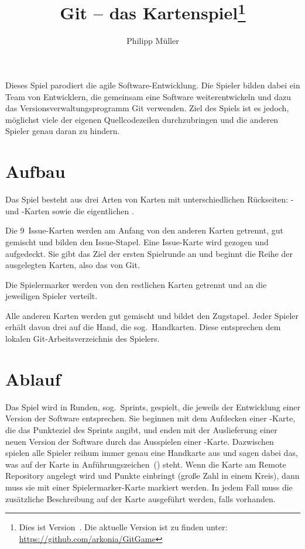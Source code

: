 \documentclass[DIV=15, fontsize=11pt]{gitgame}
\title{Git -- das Kartenspiel\footnote{Dies ist Version~\gitgameversion. Die aktuelle Version ist zu finden unter: \url{https://github.com/arkonia/GitGame}}}
\author{Philipp Müller}
\begin{document}
\maketitle

Dieses Spiel parodiert die agile Software-Entwicklung. Die Spieler bilden dabei ein Team von Entwicklern, die gemeinsam eine Software weiterentwickeln und dazu das Versionsverwaltungsprogramm Git verwenden. Ziel des Spiels ist es jedoch, möglichst viele der eigenen Quellcodezeilen durchzubringen und die anderen Spieler genau daran zu hindern.



\section{Aufbau}
Das Spiel besteht aus drei Arten von Karten mit unterschiedlichen Rückseiten: - und -Karten sowie die eigentlichen .


Die 9~Issue-Karten werden am Anfang von den anderen Karten getrennt, gut gemischt und bilden den Issue-Stapel. Eine Issue-Karte wird gezogen und aufgedeckt. Sie gibt das Ziel der ersten Spielrunde an und beginnt die Reihe der ausgelegten Karten, also das  von Git.

Die Spielermarker werden von den restlichen Karten getrennt und an die jeweiligen Spieler verteilt.

Alle anderen Karten werden gut gemischt und bildet den Zugstapel. Jeder Spieler erhält davon drei auf die Hand, die sog.\ Handkarten. Diese entsprechen dem lokalen Git-Arbeitsverzeichnis des Spielers.



\section{Ablauf}
Das Spiel wird in Runden, sog.\ Sprints, gespielt, die jeweils der Entwicklung einer Version der Software entsprechen. Sie beginnen mit dem Aufdecken einer -Karte, die das Punkteziel des Sprints angibt, und enden mit der Auslieferung einer neuen Version der Software durch das Ausspielen einer -Karte. Dazwischen spielen alle Spieler reihum immer genau eine Handkarte aus und sagen dabei das, was auf der Karte in Anführungszeichen~() steht. Wenn die Karte am Remote Repository angelegt wird und Punkte einbringt (große Zahl in einem Kreis), dann muss sie mit einer Spielermarker-Karte markiert werden. In jedem Fall muss die zusätzliche Beschreibung auf der Karte ausgeführt werden, falls vorhanden.
\end{document}
